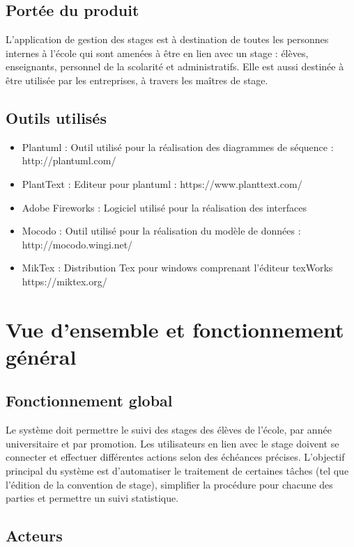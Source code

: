 \documentclass{scrreprt}
\begin{document}
\section{ Portée du produit}
L’application de gestion des stages est à destination de toutes les personnes internes à l’école qui sont amenées à être en lien avec un stage : élèves, enseignants, personnel de la scolarité et administratifs.
Elle est aussi destinée à être utilisée par les entreprises, à travers les maîtres de stage.


\section{Outils utilisés}
\begin{itemize}
\item Plantuml : Outil utilisé pour la réalisation des diagrammes de séquence : http://plantuml.com/ 
\item PlantText : Editeur pour plantuml : https://www.planttext.com/
\item Adobe Fireworks : Logiciel utilisé pour la réalisation des interfaces
\item Mocodo :  Outil utilisé pour la réalisation du modèle de données : http://mocodo.wingi.net/
\item MikTex : Distribution Tex pour windows comprenant l’éditeur texWorks https://miktex.org/
\end{itemize}

\chapter{Vue d'ensemble et fonctionnement g\'en\'eral}

\section{Fonctionnement global}
Le système doit permettre le suivi des stages des élèves de l’école, par année universitaire et par promotion. Les utilisateurs en lien avec le stage doivent se connecter et effectuer différentes actions selon des échéances précises. L’objectif principal du système est d’automatiser le traitement de certaines tâches (tel que l’édition de la convention de stage), simplifier la procédure pour chacune des parties et permettre un suivi statistique.

\section{Acteurs}
\end{document}
